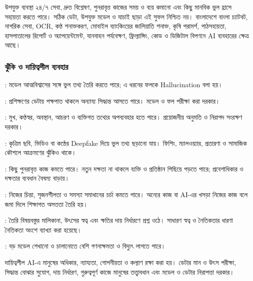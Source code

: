 \begin{topicbody}
\begin{compactpoints}
\end{compactpoints}
উপযুক্ত ব্যবস্থা ২৪/৭ সেবা, দ্রুত বিশ্লেষণ, পুনরাবৃত্ত কাজের সময় ও ব্যয় কমানো এবং কিছু মানবিক ভুল হ্রাসে সহায়তা করতে পারে। সঠিক ডেটা, উপযুক্ত মডেল ও যাচাই ছাড়া এই সুফল নিশ্চিত নয়।
বাংলাদেশে বাংলা চ্যাটবট, নাগরিক সেবা, OCR, কণ্ঠ শনাক্তকরণ, মোবাইল ব্যাংকিংয়ের জালিয়াতি শনাক্ত, কৃষি পরামর্শ, পাঠসহায়তা, হাসপাতালের রিপোর্ট ও অ্যাপয়েন্টমেন্ট, যানবাহন পর্যবেক্ষণ, ফ্রিল্যান্সিং, কোড ও ডিজিটাল বিপণনে AI ব্যবহারের ক্ষেত্র আছে।

\subsubsection{ঝুঁকি ও দায়িত্বশীল ব্যবহার}
\begin{compactpoints}
\item {}: মডেল আত্মবিশ্বাসের সঙ্গে ভুল তথ্য তৈরি করতে পারে; এ ধরনের ফলকে Hallucination বলা হয়।
\item {}: প্রশিক্ষণের ডেটায় পক্ষপাত থাকলে অন্যায্য সিদ্ধান্ত আসতে পারে। মডেল ও ফল পরীক্ষা করা দরকার।
\item {}: মুখ, কণ্ঠস্বর, অবস্থান, আচরণ ও ব্যক্তিগত তথ্যের অপব্যবহার হতে পারে। প্রয়োজনীয় অনুমতি ও নিরাপদ সংরক্ষণ দরকার।
\item {}: কৃত্রিম ছবি, ভিডিও বা কণ্ঠের Deepfake দিয়ে ভুল তথ্য ছড়ানো যায়। ফিশিং, ম্যালওয়্যার, প্রতারণা ও সামাজিক কৌশলে আক্রমণের ঝুঁকিও থাকে।
\item {}: কিছু পুনরাবৃত্ত কাজ কমতে পারে। নতুন দক্ষতা না থাকলে ব্যক্তি ও প্রতিষ্ঠান পিছিয়ে পড়তে পারে; প্রবেশাধিকার ও দক্ষতার ব্যবধান বৈষম্য বাড়ায়।
\item {}: নিজের চিন্তা, সৃজনশীলতা ও সমস্যা সমাধানের চর্চা কমতে পারে। অন্যের কাজ বা AI-এর খসড়া নিজের কাজ বলে জমা দিলে শিক্ষাগত অসততা তৈরি হয়।
\item {}: তৈরি বিষয়বস্তুর মালিকানা, উৎসের স্বত্ব এবং ক্ষতির দায় নির্ধারণে প্রশ্ন ওঠে। সাধারণ স্বত্ব ও নৈতিকতার ধারণা নৈতিকতা অংশে ব্যাখ্যা করা হয়েছে।
\item {}: বড় মডেল শেখানো ও চালানোতে বেশি গণনাক্ষমতা ও বিদ্যুৎ লাগতে পারে।
\end{compactpoints}
দায়িত্বশীল AI-এ মানুষের অধিকার, ন্যায্যতা, গোপনীয়তা ও কল্যাণ রক্ষা করা হয়। ডেটার মান ও উৎস পরীক্ষা, সিদ্ধান্ত বোঝার সুযোগ, দায় নির্ধারণ, গুরুত্বপূর্ণ কাজে মানুষের তত্ত্বাবধান এবং মডেল ও ডেটার নিরাপত্তা দরকার।

\end{topicbody}
